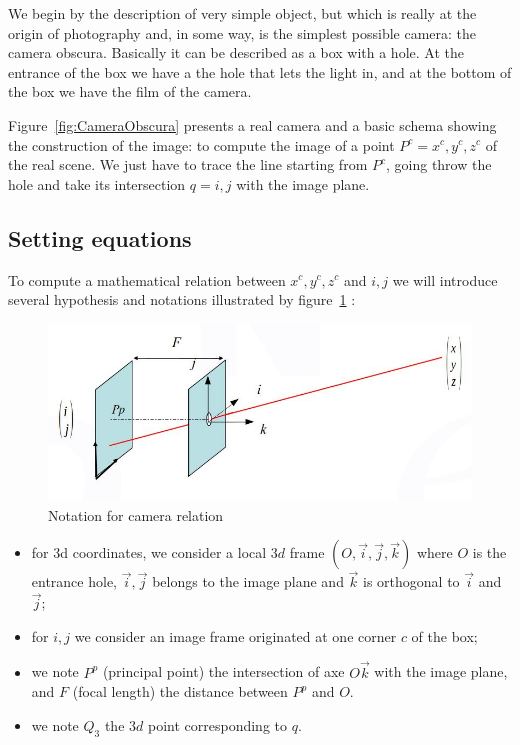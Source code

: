 We begin by the description of very simple object, but which is really at the origin of
photography and, in some way, is the simplest possible camera:  the camera obscura.
Basically it can be described as a box with a hole. At the entrance of the box we have
a the hole that lets the light in, and at the bottom of the box we have the film of
the camera. 

Figure~\ref{fig:CameraObscura} presents a real camera and a basic schema showing
the construction of the image:  to compute the image of a point $P^c=x^c,y^c,z^c$ of the real scene.
We just have to trace the line starting from $P^c$, going throw the hole and take its intersection $q=i,j$
with the image plane.


\subsection{Setting equations}

To compute a mathematical relation between $x^c,y^c,z^c$ and $i,j$ we will introduce several hypothesis 
and notations illustrated by figure~\ref{fig:Camera3DNote} :

\begin{figure}
\centering
\includegraphics[width=12cm]{Methods/Images/Camera3D.jpg}
        \caption{Notation for camera relation  }
	\label{fig:Camera3DNote}
\end{figure}

\begin{itemize}
	\item for 3d coordinates, we consider a local $3d$ frame $(O,\vec{i},\vec{j},\vec{k})$  where $O$ is the entrance hole,
              $\vec{i},\vec{j}$ belongs to the image plane and $\vec{k}$ is orthogonal to  $\vec{i}$ and $\vec{j}$;

	\item for $i,j$ we consider an image frame originated at one corner $c$ of the box;

	\item we note $P^p$ (principal point)  the intersection of axe $O\vec{k}$  with the image plane,
	      and $F$ (focal length) the distance between $P^p$ and $O$.

        \item we note $Q_3$  the $3d$ point corresponding to $q$.

\end{itemize}

